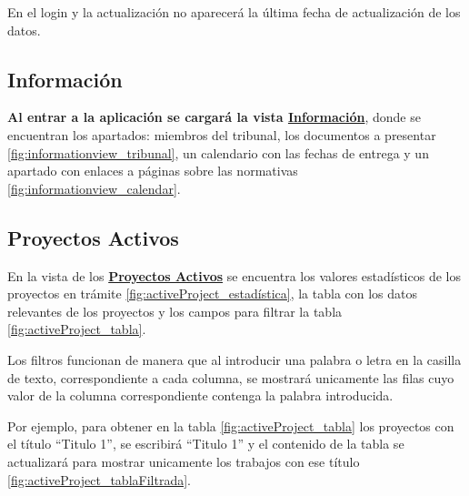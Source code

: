 
En el login y la actualización no aparecerá la última fecha de actualización de los datos.

\subsection{Información} 
\textbf{Al entrar a la aplicación se cargará la vista \href{https://gestor-tfg-2021.herokuapp.com/}{Información}}, donde se encuentran los apartados: miembros del tribunal, los documentos a presentar \ref{fig:informationview_tribunal}, un calendario con las fechas de entrega y un apartado con enlaces a páginas sobre las normativas \ref{fig:informationview_calendar}.



\subsection{Proyectos Activos} 
En la vista de los \textbf{\href{https://gestor-tfg-2021.herokuapp.com/active-projects}{Proyectos Activos}} se encuentra los valores estadísticos de los proyectos en trámite \ref{fig:activeProject_estadística}, la tabla con los datos relevantes de los proyectos y los campos para filtrar la tabla \ref{fig:activeProject_tabla}.



Los filtros funcionan de manera que al introducir una palabra o letra en la casilla de texto, correspondiente a cada columna, se mostrará unicamente las filas cuyo valor de la columna correspondiente contenga la palabra introducida. 

Por ejemplo, para obtener en la tabla \ref{fig:activeProject_tabla} los proyectos con el título ``Titulo 1'', se escribirá ``Titulo 1'' y el contenido de la tabla se actualizará para mostrar unicamente los trabajos con ese título \ref{fig:activeProject_tablaFiltrada}.


